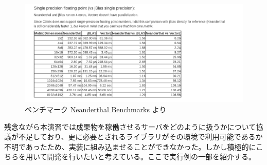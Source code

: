 \documentclass{scrartcl}
\begin{document}
\begin{figure}[htbp]
\centering
\includegraphics[width=.9\linewidth]{./neanderthal.png}
\caption{ベンチマーク \href{http://neanderthal.uncomplicate.org/articles/benchmarks.html}{Neanderthal Benchmarks} より}
\end{figure}

\newpage
残念ながら本演習では成果物を稼働させるサーバをどのように扱うかについて協議が不足しており、更に必要とされるライブラリがその環境で利用可能であるか不明であったため、実装に組み込ませることができなかった。しかし積極的にこちらを用いて開発を行いたいと考えている。ここで実行例の一部を紹介する。\\
\end{document}
